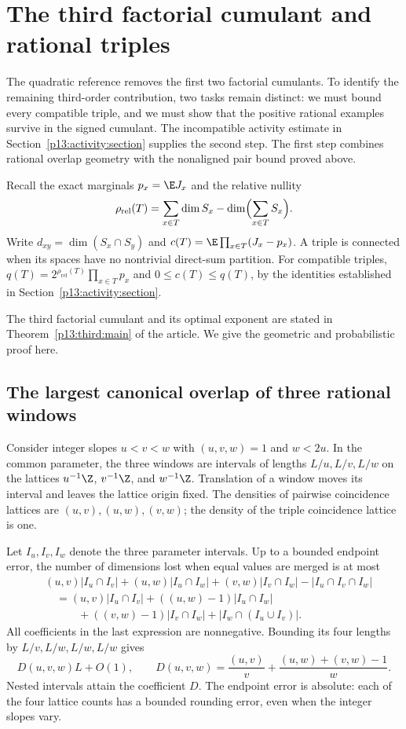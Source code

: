 \section{The third factorial cumulant and rational triples}
\label{p13:third:section}

The quadratic reference removes the first two factorial cumulants.  To
identify the remaining third-order contribution, two tasks remain distinct:
we must bound every compatible triple, and we must show that the positive
rational examples survive in the signed cumulant.  The incompatible
activity estimate in Section~\ref{p13:activity:section} supplies the second
step.  The first step combines rational overlap geometry with the
nonaligned pair bound proved above.

Recall the exact marginals $p_x=\E J_x$ and the relative nullity
\[
 \rho_{\mathrm{rel}}(T)=\sum_{x\in T}\dim S_x
                    -\dim\Bigl(\sum_{x\in T}S_x\Bigr).
\]
Write $d_{xy}=\dim(S_x\cap S_y)$ and
$c(T)=\E\prod_{x\in T}(J_x-p_x)$.  A triple is connected when its
spaces have no nontrivial direct-sum partition.  For compatible triples,
$q(T)=2^{\rho_{\mathrm{rel}}(T)}\prod_{x\in T}p_x$ and
$0\leq c(T)\leq q(T)$, by the identities established in
Section~\ref{p13:activity:section}.

The third factorial cumulant and its optimal exponent are stated in
Theorem~\ref{p13:third:main} of the article. We give the geometric
and probabilistic proof here.

\subsection{The largest canonical overlap of three rational windows}

Consider integer slopes $u<v<w$ with $(u,v,w)=1$ and $w<2u$.
In the common parameter, the three windows are intervals of lengths
$L/u,L/v,L/w$ on the lattices $u^{-1}\Z$, $v^{-1}\Z$, and
$w^{-1}\Z$.  Translation of a window moves its interval and leaves
the lattice origin fixed.  The densities of pairwise coincidence
lattices are $(u,v),(u,w),(v,w)$; the density of the triple coincidence
lattice is one.

Let $I_u,I_v,I_w$ denote the three parameter intervals.  Up to a bounded
endpoint error, the number of dimensions lost when equal values are
merged is at most
\begin{align*}
 &(u,v)|I_u\cap I_v|+(u,w)|I_u\cap I_w|
       +(v,w)|I_v\cap I_w|-|I_u\cap I_v\cap I_w|\\
 &\quad=(u,v)|I_u\cap I_v|+((u,w)-1)|I_u\cap I_w|\\
 &\qquad\quad+((v,w)-1)|I_v\cap I_w|
                         +|I_w\cap(I_u\cup I_v)|.
\end{align*}
All coefficients in the last expression are nonnegative.  Bounding its
four lengths by $L/v,L/w,L/w,L/w$ gives
\begin{equation}
 D(u,v,w)L+O(1),\qquad
 D(u,v,w)=\frac{(u,v)}v+\frac{(u,w)+(v,w)-1}{w}.
 \label{p13:third:density}
\end{equation}
Nested intervals attain the coefficient $D$.
The endpoint error is absolute: each of the four lattice counts has a
bounded rounding error, even when the integer slopes vary.

